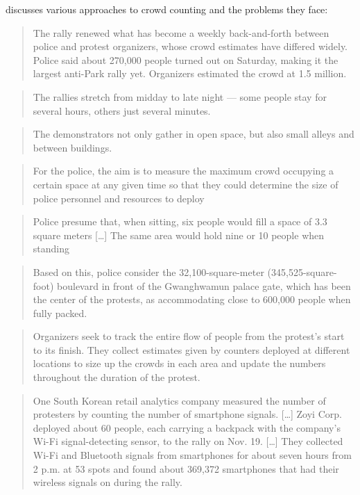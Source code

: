 \Textcite{2016DemonstrationsInSeoul} discusses various approaches to crowd 
counting and the problems they face:

\blockcquote{2016DemonstrationsInSeoul}{%
  The rally renewed what has become a weekly back-and-forth between police and 
  protest organizers, whose crowd estimates have differed widely. Police said 
  about 270,000 people turned out on Saturday, making it the largest anti-Park 
  rally yet. Organizers estimated the crowd at 1.5 million.%
}

\blockcquote{2016DemonstrationsInSeoul}{%
  The rallies stretch from midday to late night --- some people stay for 
  several hours, others just several minutes.%
}

\blockcquote{2016DemonstrationsInSeoul}{%
  The demonstrators not only gather in open space, but also small alleys and 
  between buildings.%
}

\blockcquote{2016DemonstrationsInSeoul}{%
  For the police, the aim is to measure the maximum crowd occupying a certain 
  space at any given time so that they could determine the size of police 
  personnel and resources to deploy%
}

\blockcquote{2016DemonstrationsInSeoul}{%
  Police presume that, when sitting, six people would fill a space of 3.3 
  square meters
  [\dots]
  The same area would hold nine or 10 people when standing%
}

\blockcquote{2016DemonstrationsInSeoul}{%
  Based on this, police consider the 32,100-square-meter (345,525-square-foot) 
  boulevard in front of the Gwanghwamun palace gate, which has been the center 
  of the protests, as accommodating close to 600,000 people when fully packed.%
}

\blockcquote{2016DemonstrationsInSeoul}{%
  Organizers seek to track the entire flow of people from the protest’s start 
  to its finish. They collect estimates given by counters deployed at different 
  locations to size up the crowds in each area and update the numbers 
  throughout the duration of the protest.%
}

\blockcquote{2016DemonstrationsInSeoul}{%
  One South Korean retail analytics company measured the number of protesters 
  by counting the number of smartphone signals.
  [\dots]
  Zoyi Corp. deployed about 60 people, each carrying a backpack with the 
  company’s Wi-Fi signal-detecting sensor, to the rally on Nov. 19.
  [\dots]
  They collected Wi-Fi and Bluetooth signals from smartphones for about seven 
  hours from 2 p.m. at 53 spots and found about 369,372 smartphones that had 
  their wireless signals on during the rally.%
}

